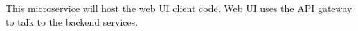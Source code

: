 This microservice will host the web UI client code. Web UI uses the A\+PI gateway to talk to the backend services. 